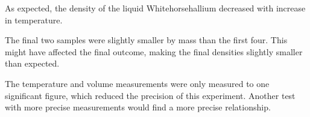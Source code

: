 \documentclass[11pt, oneside]{article}   	%
\newcommand{\chemname}{Whitehorsehallium }
\begin{document}
 As expected, the density of the liquid \chemname decreased with increase in temperature.
 
 The final two samples were slightly smaller by mass than the first four. This might have affected the final outcome, making the final densities slightly smaller than expected.
 
 The temperature and volume measurements were only measured to one significant figure, which reduced the precision of this experiment.
 Another test with more precise measurements would find a more precise relationship.
\end{document}
